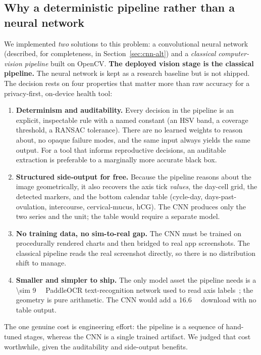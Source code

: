 \documentclass[11pt,a4paper]{article}
\begin{document}
\subsection{Why a deterministic pipeline rather than a neural network}
\label{sec:why-cv}
We implemented \emph{two} solutions to this problem: a convolutional neural
network (described, for completeness, in Section~\ref{sec:cnn-alt}) and a
\emph{classical computer-vision pipeline} built on OpenCV. \textbf{The
deployed vision stage is the classical pipeline.} The neural network is
kept as a research baseline but is not shipped. The decision rests on four
properties that matter more than raw accuracy for a privacy-first,
on-device health tool:

\begin{enumerate}
  \item \textbf{Determinism and auditability.} Every decision in the
  pipeline is an explicit, inspectable rule with a named constant (an HSV
  band, a coverage threshold, a RANSAC tolerance). There are no learned
  weights to reason about, no opaque failure modes, and the same input
  always yields the same output. For a tool that informs reproductive
  decisions, an auditable extraction is preferable to a marginally more
  accurate black box.
  \item \textbf{Structured side-output for free.} Because the pipeline
  reasons about the image geometrically, it also recovers the axis tick
  \emph{values}, the day-cell grid, the detected markers, and the bottom
  calendar table (cycle-day, days-past-ovulation, intercourse,
  cervical-mucus, hCG). The CNN produces only the two series and the unit;
  the table would require a separate model.
  \item \textbf{No training data, no sim-to-real gap.} The CNN must be
  trained on procedurally rendered charts and then bridged to real app
  screenshots. The classical pipeline reads the real screenshot directly,
  so there is no distribution shift to manage.
  \item \textbf{Smaller and simpler to ship.} The only model asset the
  pipeline needs is a \SI{\sim 9}{\mega\byte} PaddleOCR text-recognition
  network used to read axis labels~\cite{du2020ppocr}; the geometry is pure
  arithmetic. The CNN would add a \SI{16.6}{\mega\byte} download with no
  table output.
\end{enumerate}

The one genuine cost is engineering effort: the pipeline is a sequence of
hand-tuned stages, whereas the CNN is a single trained artifact. We judged
that cost worthwhile, given the auditability and side-output benefits.
\end{document}
